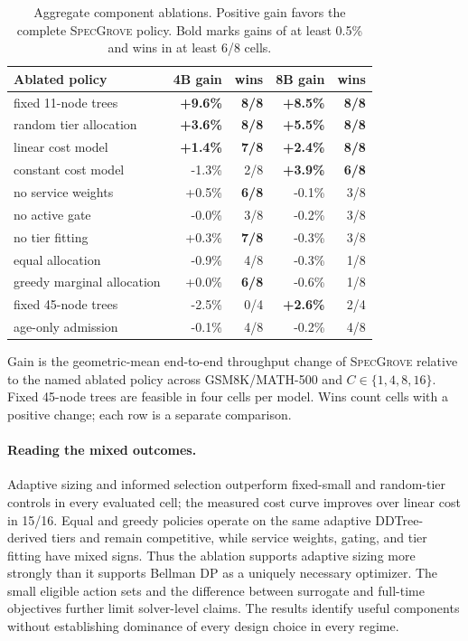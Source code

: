 \documentclass{article}
\newcommand{\method}{\textsc{SpecGrove}\xspace}
\begin{document}
\begin{table}[H]
\caption{Aggregate component ablations. Positive gain favors the complete \method policy. Bold marks gains of at least 0.5\% and wins in at least 6/8 cells.}
\label{tab:ablation-full}
\centering\small
\setlength{\tabcolsep}{7.0pt}
\renewcommand{\arraystretch}{1.08}
\begin{tabular}{@{}lrrrr@{}}
\toprule
Ablated policy & 4B gain & wins & 8B gain & wins\\
\midrule
fixed 11-node trees & \textbf{+9.6\%} & \textbf{8/8} & \textbf{+8.5\%} & \textbf{8/8}\\
random tier allocation & \textbf{+3.6\%} & \textbf{8/8} & \textbf{+5.5\%} & \textbf{8/8}\\
linear cost model & \textbf{+1.4\%} & \textbf{7/8} & \textbf{+2.4\%} & \textbf{8/8}\\
constant cost model & -1.3\% & 2/8 & \textbf{+3.9\%} & \textbf{6/8}\\
no service weights & +0.5\% & \textbf{6/8} & -0.1\% & 3/8\\
no active gate & -0.0\% & 3/8 & -0.2\% & 3/8\\
no tier fitting & +0.3\% & \textbf{7/8} & -0.3\% & 3/8\\
equal allocation & -0.9\% & 4/8 & -0.3\% & 1/8\\
greedy marginal allocation & +0.0\% & \textbf{6/8} & -0.6\% & 1/8\\
fixed 45-node trees & -2.5\% & 0/4 & \textbf{+2.6\%} & 2/4\\
age-only admission & -0.1\% & 4/8 & -0.2\% & 4/8\\
\bottomrule
\end{tabular}
\vspace{2pt}\parbox{0.97\linewidth}{\small Gain is the geometric-mean end-to-end throughput change of \method relative to the named ablated policy across GSM8K/MATH-500 and $C\in\{1,4,8,16\}$. Fixed 45-node trees are feasible in four cells per model. Wins count cells with a positive change; each row is a separate comparison.}
\end{table}



\paragraph{Reading the mixed outcomes.}
Adaptive sizing and informed selection outperform fixed-small and random-tier controls in every evaluated cell; the measured cost curve improves over linear cost in 15/16. Equal and greedy policies operate on the same adaptive DDTree-derived tiers and remain competitive, while service weights, gating, and tier fitting have mixed signs. Thus the ablation supports adaptive sizing more strongly than it supports Bellman DP as a uniquely necessary optimizer. The small eligible action sets and the difference between surrogate and full-time objectives further limit solver-level claims. The results identify useful components without establishing dominance of every design choice in every regime.
\end{document}
